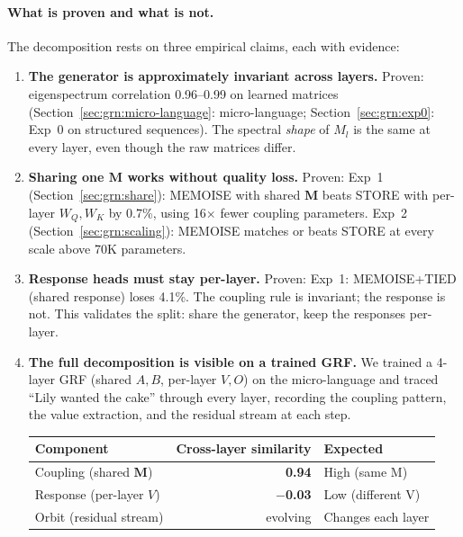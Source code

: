 \documentclass[11pt, a4paper]{article}
\newcommand{\M}{\mathbf{M}}
\theoremstyle{remark}
\begin{document}
\paragraph{What is proven and what is not.}
The decomposition rests on three empirical claims, each with evidence:

\begin{enumerate}[nosep]
    \item \textbf{The generator is approximately invariant across layers.}
    Proven: eigenspectrum correlation 0.96--0.99 on learned matrices
    (Section~\ref{sec:grn:micro-language}: micro-language;
    Section~\ref{sec:grn:exp0}: Exp~0 on structured sequences).
    The spectral \emph{shape} of $M_l$ is the same at every layer, even though the raw matrices differ.

    \item \textbf{Sharing one $\M$ works without quality loss.}
    Proven: Exp~1 (Section~\ref{sec:grn:share}): MEMOISE with shared $\M$ beats STORE with per-layer $W_Q, W_K$ by 0.7\%, using 16$\times$ fewer coupling parameters.
    Exp~2 (Section~\ref{sec:grn:scaling}): MEMOISE matches or beats STORE at every scale above 70K parameters.

    \item \textbf{Response heads must stay per-layer.}
    Proven: Exp~1: MEMOISE+TIED (shared response) loses 4.1\%.
    The coupling rule is invariant; the response is not.
    This validates the split: share the generator, keep the responses per-layer.

    \item \textbf{The full decomposition is visible on a trained GRF.}
    We trained a 4-layer GRF (shared $A, B$, per-layer $V, O$) on the micro-language and traced ``Lily wanted the cake'' through every layer, recording the coupling pattern, the value extraction, and the residual stream at each step.

    \begin{center}\small
    \renewcommand{\arraystretch}{1.2}
    \begin{tabular}{@{}lrl@{}}
    \toprule
    \textbf{Component} & \textbf{Cross-layer similarity} & \textbf{Expected} \\
    \midrule
    Coupling (shared $\M$) & \textbf{0.94} & High (same M) \\
    Response (per-layer $V$) & \textbf{$-$0.03} & Low (different V) \\
    Orbit (residual stream) & evolving & Changes each layer \\
    \bottomrule
    \end{tabular}
    \end{center}


\end{enumerate}
\end{document}
